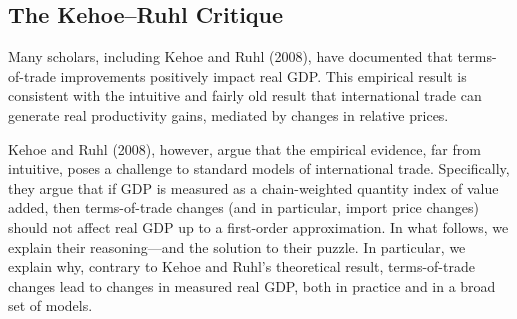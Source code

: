 \documentclass[12pt]{article}
\begin{document}
\subsection{The Kehoe--Ruhl Critique}

Many scholars, including Kehoe and Ruhl (2008), have documented that
terms-of-trade improvements positively impact real GDP. This empirical
result is consistent with the intuitive and fairly old result that
international trade can generate real productivity gains, mediated by
changes in relative prices.

Kehoe and Ruhl (2008), however, argue that the empirical evidence, far from
intuitive, poses a challenge to standard models of international trade.
Specifically, they argue that if GDP is measured as a chain-weighted
quantity index of value added, then terms-of-trade changes (and in
particular, import price changes) should not affect real GDP up to a
first-order approximation. In what follows, we explain their reasoning---and
the solution to their puzzle. In particular, we explain why, contrary to
Kehoe and Ruhl's theoretical result, terms-of-trade changes lead to changes
in measured real GDP, both in practice and in a broad set of models.
\end{document}
